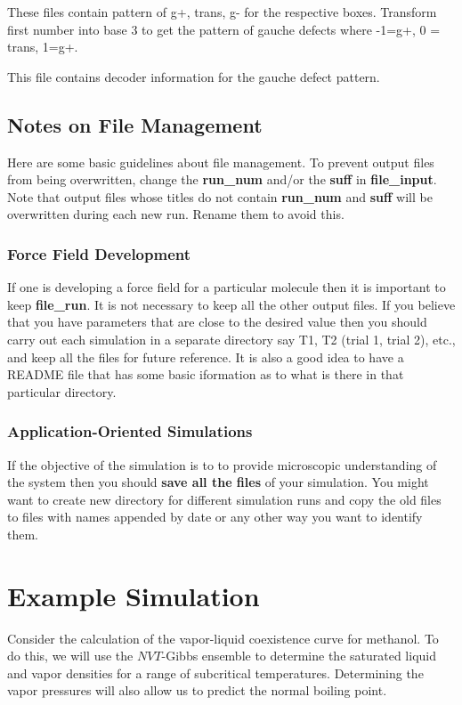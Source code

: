 \documentclass[12pt,letterpaper]{article}
\begin{document}
These files contain pattern of g+, trans, g- for the
respective boxes. Transform first number into base 3 to get
the pattern of gauche defects where -1=g+, 0 = trans, 1=g+.

 This file contains decoder
information for the gauche defect pattern.

\subsection{Notes on File Management}
\noindent Here are some basic guidelines about file
management. To prevent output files from being overwritten,
change the {\bf run\_num} and/or the {\bf suff} in {\bf
  file\_input}. Note that output files whose titles do not
contain {\bf run\_num} and {\bf suff} will be overwritten
during each new run. Rename them to avoid this.

\subsubsection{Force Field Development} If one is developing a force
field for a particular molecule then it is important to keep
{\bf file\_run}. It is not necessary to keep all the other
output files. If you believe that you have parameters that
are close to the desired value then you should carry out
each simulation in a separate directory say T1, T2 (trial 1,
trial 2), etc., and keep all the files for future reference.
It is also a good idea to have a README file that has some
basic iformation as to what is there in that particular
directory.

\subsubsection{Application-Oriented Simulations} If the objective of
the simulation is to to provide microscopic understanding of
the system then you should {\bf save all the files} of your
simulation. You might want to create new directory for
different simulation runs and copy the old files to files
with names appended by date or any other way you want to
identify them.

\section{Example Simulation}
Consider the calculation of the vapor-liquid coexistence
curve for methanol. To do this, we will use the $NVT$-Gibbs
ensemble to determine the saturated liquid and vapor
densities for a range of subcritical temperatures.
Determining the vapor pressures will also allow us to
predict the normal boiling point.
\end{document}

